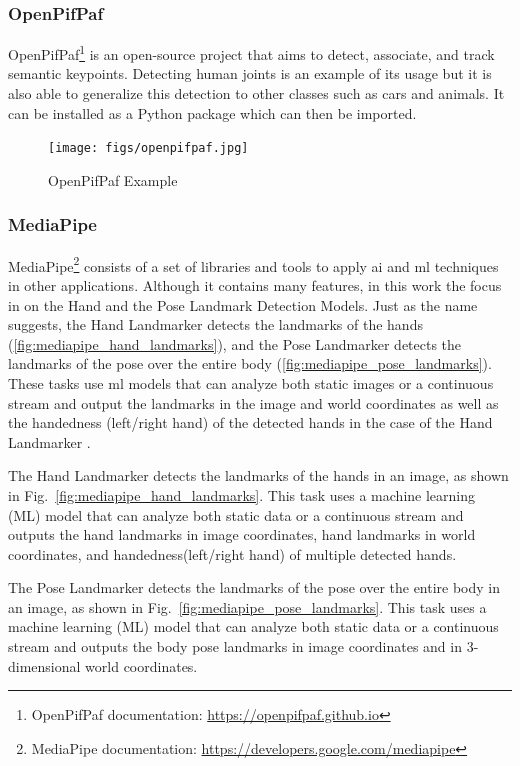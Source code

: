 \subsubsection{OpenPifPaf}

OpenPifPaf\cite{Kreiss2021,Kreiss2019}\footnote{OpenPifPaf documentation: \url{https://openpifpaf.github.io}} is an open-source project that aims to detect, associate, and track semantic keypoints. Detecting human joints is an example of its usage but it is also able to generalize this detection to other classes such as cars and animals. It can be installed as a Python package which can then be imported.

\begin{figure}[ht]
    \centering
    \texttt{[image: figs/openpifpaf.jpg]}
    \caption[OpenPifPaf Example]{OpenPifPaf Example \cite{Kreiss2021}}
    \label{fig:openpifpaf}
\end{figure}

\subsubsection{MediaPipe}

MediaPipe\footnote{MediaPipe documentation: \url{https://developers.google.com/mediapipe}} consists of a set of libraries and tools to apply \acs{ai} and \acs{ml} techniques in other applications. Although it contains many features, in this work the focus in on the Hand and the Pose Landmark Detection Models. Just as the name suggests, the Hand Landmarker detects the landmarks of the hands (\autoref{fig:mediapipe_hand_landmarks}), and the Pose Landmarker detects the landmarks of the pose over the entire body (\autoref{fig:mediapipe_pose_landmarks}). These tasks use \acs{ml} models that can analyze both static images or a continuous stream and output the landmarks in the image and world coordinates as well as the handedness (left/right hand) of the detected hands in the case of the Hand Landmarker \cite{mediapipe_docs}.

The Hand Landmarker detects the landmarks of the hands in an image, as shown in Fig.~\ref{fig:mediapipe_hand_landmarks}. This task uses a machine learning (ML) model that can analyze both static data or a continuous stream and outputs the hand landmarks in image coordinates, hand landmarks in world coordinates, and handedness(left/right hand) of multiple detected hands.

The Pose Landmarker detects the landmarks of the pose over the entire body in an image, as shown in Fig.~\ref{fig:mediapipe_pose_landmarks}.  This task uses a machine learning (ML) model that can analyze both static data or a continuous stream and outputs the body pose landmarks in image coordinates and in 3-dimensional world coordinates.
\fi

